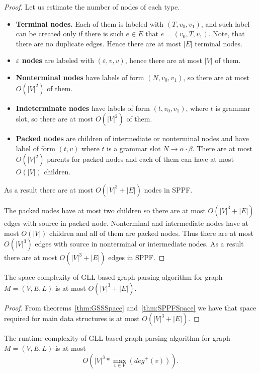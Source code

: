 \begin{proof}
Let us estimate the number of nodes of each type.
\begin{itemize}
\item \textbf{Terminal nodes.} 
Each of them is labeled with $(T, v_0, v_1)$, and such label can be created only if there is such $e \in E$ that $e=(v_0,T,v_1)$. 
Note, that there are no duplicate edges. 
Hence there are at most $|E|$ terminal nodes.
\item \textbf{$\varepsilon$ nodes} are labeled with $(\varepsilon, v ,v)$, hence there are at most $|V|$ of them. 
\item \textbf{Nonterminal nodes} have labels of form $(N,v_0,v_1)$, so there are at most $O(|V|^2)$ of them.
\item \textbf{Indeterminate nodes} have labels of form $(t,v_0,v_1)$, where $t$ is grammar slot, so there are at most $O(|V|^2)$ of them.
\item \textbf{Packed nodes} are children of intermediate or nonterminal nodes and have label of form $(t,v)$ where $t$ is a grammar slot $N \rightarrow \alpha \cdot \beta$.
There are at most $O(|V|^2)$ parents for packed nodes and each of them can have at most $O(|V|)$ children.
\end{itemize}

As a result there are at most $O(|V|^3 + |E|)$ nodes in SPPF.

The packed nodes have at most two children so there are at most $O(|V|^3 + |E|)$ edges with source in packed node. 
Nonterminal and intermediate nodes have at most $O(|V|)$ children and all of them are packed nodes.
Thus there are at most $O(|V|^3)$ edges with source in nonterminal or intermediate nodes. As a result there are at most $O(|V|^3 + |E|)$ edges in SPPF.


\end{proof}

\begin{mytheorem}
The space complexity of GLL-based graph parsing algorithm for graph $M=(V,E,L)$ is at most $O(|V|^3 + |E|)$.
\end{mytheorem}

\begin{proof}

From theorems~\ref{thm:GSSSpace} and~\ref{thm:SPPFSpace} we have that space required for main data structures is at most $O(|V|^3 + |E|)$. 

\end{proof}


\begin{mytheorem}\label{thm:complexity}
The runtime complexity of GLL-based graph parsing algorithm for graph $M=(V,E,L)$ is at most $$O\left(|V|^3*\max\limits_{v \in V}\left(deg^+\left(v\right)\right)\right).$$
\end{mytheorem}

